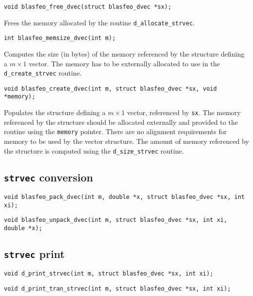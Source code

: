 \documentclass[a4paper]{report}
\begin{document}
\begin{verbatim}
void blasfeo_free_dvec(struct blasfeo_dvec *sx);
\end{verbatim}
Frees the memory allocated by the routine {\tt d\_allocate\_strvec}.

\begin{verbatim}
int blasfeo_memsize_dvec(int m);
\end{verbatim}
Computes the size (in bytes) of the memory referenced by the structure defining a $m\times 1$ vector.
The memory has to be externally allocated to use in the {\tt d\_create\_strvec} routine.

\begin{verbatim}
void blasfeo_create_dvec(int m, struct blasfeo_dvec *sx, void *memory);
\end{verbatim}
Populates the structure defining a $m\times 1$ vector, referenced by {\tt sx}.
The memory referenced by the structure should be allocated externally and provided to the routine using the {\tt memory} pointer.
There are no alignment requirements for memory to be used by the vector structure. %
The amount of memory referenced by the structure is computed using the {\tt d\_size\_strvec} routine.



\subsection{{\tt strvec} conversion}

\begin{verbatim}
void blasfeo_pack_dvec(int m, double *x, struct blasfeo_dvec *sx, int xi);
\end{verbatim}

\begin{verbatim}
void blasfeo_unpack_dvec(int m, struct blasfeo_dvec *sx, int xi, double *x);
\end{verbatim}



\subsection{{\tt strvec} print}

\begin{verbatim}
void d_print_strvec(int m, struct blasfeo_dvec *sx, int xi);
\end{verbatim}

\begin{verbatim}
void d_print_tran_strvec(int m, struct blasfeo_dvec *sx, int xi);
\end{verbatim}
\end{document}
